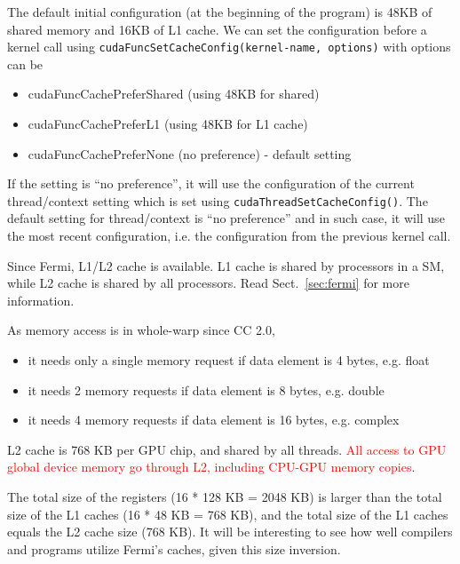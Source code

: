 \begin{framed}
  The default initial configuration (at the beginning of the program)
  is 48KB of shared memory and 16KB of L1 cache. We can set the
  configuration before a kernel call using
  \verb!cudaFuncSetCacheConfig(kernel-name, options)! with options can
  be
  \begin{itemize}
  \item cudaFuncCachePreferShared (using 48KB for shared)
  \item cudaFuncCachePreferL1 (using 48KB for L1 cache)
  \item cudaFuncCachePreferNone (no preference) - default setting
  \end{itemize}
  If the setting is ``no preference'', it will use the configuration
  of the current thread/context setting which is set using
  \verb!cudaThreadSetCacheConfig()!. The default setting for
  thread/context is ``no preference'' and in such case, it will use
  the most recent configuration, i.e. the configuration from the
  previous kernel call.  
\end{framed}


Since Fermi, L1/L2 cache is available. L1 cache is shared by
processors in a SM, while L2 cache is shared by all processors. Read
Sect.~\ref{sec:fermi} for more information. 


As memory access is in whole-warp since CC 2.0,
\begin{itemize}
\item it needs only a single memory request if data element is 4 bytes,
  e.g. float
\item it needs 2 memory requests if data element is 8 bytes,
  e.g. double
\item it needs 4 memory requests if data element is 16 bytes,
  e.g. complex 
\end{itemize}

L2 cache is 768 KB per GPU chip, and shared by all threads.
\textcolor{red}{All access to GPU global device memory go through L2,
  including CPU-GPU memory copies}.
\begin{framed}
  The total size of the registers (16 * 128 KB = 2048 KB) is larger
  than the total size of the L1 caches (16 * 48 KB = 768 KB), and the
  total size of the L1 caches equals the L2 cache size (768 KB). It
  will be interesting to see how well compilers and programs utilize
  Fermi's caches, given this size inversion.
\end{framed}

